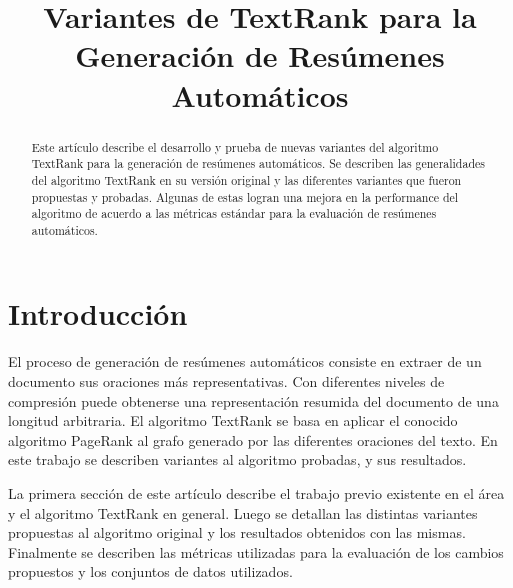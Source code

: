 \documentclass{llncs}
\begin{document}
\frontmatter

\title{Variantes de TextRank para la Generación de Resúmenes Automáticos}



\maketitle

\begin{abstract}
Este artículo describe el desarrollo y prueba de nuevas variantes del algoritmo
TextRank para la generación de resúmenes automáticos. Se describen las generalidades
del algoritmo TextRank en su versión original y las diferentes variantes
que fueron propuestas y probadas. Algunas de estas logran una mejora en
la performance del algoritmo de acuerdo a las métricas estándar para la evaluación de
resúmenes automáticos. 

\end{abstract}

\section{Introducción}
El proceso de generación de resúmenes automáticos consiste en extraer de un documento sus oraciones más representativas. Con diferentes niveles de compresión puede obtenerse una representación resumida del documento de una longitud arbitraria. El algoritmo TextRank se basa en aplicar el conocido algoritmo PageRank al grafo generado por las diferentes oraciones del texto. En este trabajo se describen variantes al algoritmo probadas, y sus resultados.

La primera sección de este artículo describe el trabajo previo existente en el área y el algoritmo TextRank en general. Luego se detallan las distintas variantes propuestas al algoritmo original y los resultados obtenidos con las mismas. Finalmente se describen las métricas utilizadas para la evaluación de los cambios propuestos y los conjuntos de datos utilizados.
\end{document}
